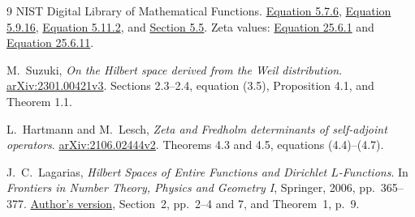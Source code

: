 \documentclass[11pt]{article}
\begin{document}
\begin{thebibliography}{9}
NIST Digital Library of Mathematical Functions.
\href{https://dlmf.nist.gov/5.7.E6}{Equation 5.7.6},
\href{https://dlmf.nist.gov/5.9.E16}{Equation 5.9.16},
\href{https://dlmf.nist.gov/5.11.E2}{Equation 5.11.2}, and
\href{https://dlmf.nist.gov/5.5}{Section 5.5}.
Zeta values: \href{https://dlmf.nist.gov/25.6.E1}{Equation 25.6.1} and
\href{https://dlmf.nist.gov/25.6.E11}{Equation 25.6.11}.

M.~Suzuki, \emph{On the Hilbert space derived from the Weil distribution}.
\href{https://arxiv.org/html/2301.00421v3}{arXiv:2301.00421v3}.
Sections 2.3--2.4, equation (3.5), Proposition 4.1, and Theorem 1.1.

L.~Hartmann and M.~Lesch,
\emph{Zeta and Fredholm determinants of self-adjoint operators}.
\href{https://arxiv.org/html/2106.02444v2}{arXiv:2106.02444v2}.
Theorems 4.3 and 4.5, equations (4.4)--(4.7).

J.~C.~Lagarias,
\emph{Hilbert Spaces of Entire Functions and Dirichlet $L$-Functions}.
In \emph{Frontiers in Number Theory, Physics and Geometry I},
Springer, 2006, pp.~365--377.
\href{https://websites.umich.edu/~lagarias/doc/debranges-houches.pdf}{Author's version},
Section~2, pp.~2--4 and 7, and Theorem~1, p.~9.
\end{thebibliography}
\end{document}
